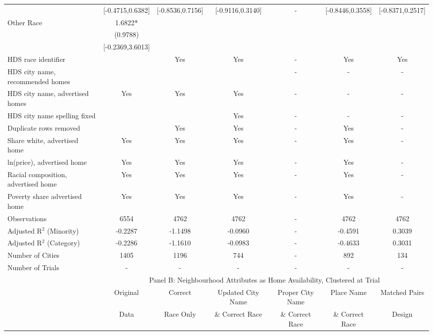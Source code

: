 \begin{table}[htbp]
{\begin{tabular}{l*{6}{c}}
 & [-0.4715,0.6382] & [-0.8536,0.7156] & [-0.9116,0.3140] & - & [-0.8446,0.3558] & [-0.8371,0.2517] \\
Other Race & 1.6822* &  &  &  &  &  \\
 & (0.9788) &  &  &  &  &  \\
 & [-0.2369,3.6013] &  &  &  &  &  \\
\midrule
HDS race identifier & & Yes & Yes & - & Yes & Yes \\
HDS city name, recommended homes &  &  & &- & - & -\\
HDS city name, advertised homes & Yes & Yes & Yes & - & - & -\\
HDS city name spelling fixed & & & Yes & - & - & -\\
Duplicate rows removed &  & Yes & Yes & - & Yes & - \\
\midrule
Share white, advertised home  & Yes & Yes & Yes & - & Yes & - \\
ln(price), advertised home  & Yes & Yes & Yes & - & Yes & - \\
Racial composition, advertised home & Yes & Yes & Yes & - & Yes & - \\
Poverty share advertised home & Yes & Yes & Yes & - & Yes & - \\
Observations & 6554 & 4762 & 4762 & - & 4762 & 4762 \\
Adjusted R$^2$ (Minority) & -0.2287 & -1.1498 & -0.0960 & - & -0.4591 & 0.3039 \\
Adjusted R$^2$ (Category) & -0.2286 & -1.1610 & -0.0983 & - & -0.4633 & 0.3031 \\
Number of Cities & 1405 & 1196 & 744 & - & 892 & 134 \\
Number of Trials & - & - & - & - & - & - \\
\bottomrule
\toprule
& \multicolumn{6}{c}{Panel B: Neighbourhood Attributes as Home Availability, Clustered at Trial}\\
\toprule
                    &\multicolumn{1}{c}{Original}&\multicolumn{1}{c}{Correct}&\multicolumn{1}{c}{Updated City Name}&\multicolumn{1}{c}{Proper City Name}&\multicolumn{1}{c}{Place Name}&\multicolumn{1}{c}{Matched Pairs}\\
                      &\multicolumn{1}{c}{Data}&\multicolumn{1}{c}{Race Only}&\multicolumn{1}{c}{\& Correct Race}&\multicolumn{1}{c}{\& Correct Race}&\multicolumn{1}{c}{\& Correct Race}&\multicolumn{1}{c}{Design}\\                  
                    \cmidrule(lr){2-2}\cmidrule(lr){3-3}\cmidrule(lr){4-4}\cmidrule(lr){5-5}\cmidrule(lr){6-6}\cmidrule(lr){7-7}

\end{tabular}}
\end{table}
